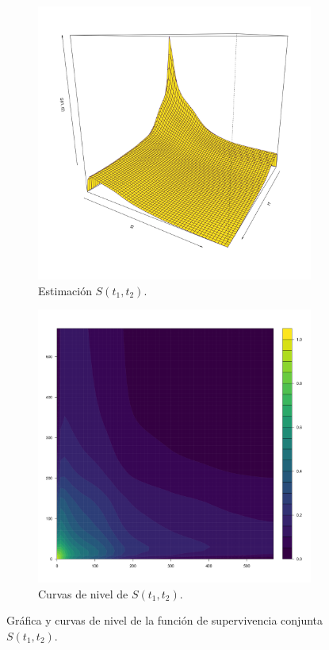 \documentclass[11pt,a4paper]{article}
\begin{document}
\begin{figure}[!htb]
    \centering
    \begin{subfigure}[t]{0.45\textwidth}
        \centering
        \includegraphics[width=\linewidth]{surv_fun.png}
        \caption{Estimación $S(t_1, t_2)$.}
        \label{fig:surv_fun_3d}
    \end{subfigure}
    \hfill
    \begin{subfigure}[t]{0.45\textwidth}
        \centering
        \includegraphics[width=\linewidth]{surv_fun_contour.png} 
        \caption{Curvas de nivel de $S(t_1, t_2)$.}
        \label{fig:surv_fun_contour}
    \end{subfigure}
    \caption{Gráfica y curvas de nivel de la función de supervivencia conjunta $S(t_1, t_2)$.}
    \label{fig:surv_fun}
\end{figure}
\end{document}
